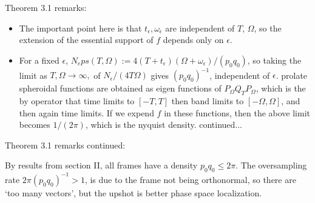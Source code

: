 \documentclass{beamer}
\newcommand{\eps}[0] {  \epsilon }
\begin{document}
\begin{frame}

Theorem 3.1 remarks:

\begin{itemize}
\item The important point here is that $t_\eps, \omega_\eps$ are independent of $T$, $\Omega$, so the extension of the essential support of $f$ depends only on $\eps$.
\item For a fixed $\eps$, $N_eps(T,\Omega) := 4(T + t_\eps)(\Omega + \omega_\eps)/(p_0 q_0)$, so taking the limit as $T,\Omega \rightarrow \infty,$ of $N_\eps/(4 T \Omega)$ gives $(p_0 q_0)^{-1}$, independent of $\eps$. prolate spheroidal functions are obtained as eigen functions of $P_\Omega Q_T P_\Omega$, which is the by operator that time limits to $[-T,T]$ then band limits to $[-\Omega,\Omega]$, and then again time limits. If we expend $f$ in these functions, then the above limit becomes $1/(2 \pi)$, which is the nyquist density. continued...
\end{itemize}



\end{frame}



\begin{frame}

Theorem 3.1 remarks continued:

By results from section II, all frames have a density $p_0 q_0 \le 2 \pi$. The oversampling rate $2 \pi (p_0 q_0)^{-1} > 1$, is due to the frame not being orthonormal, so there are `too many vectors', but the upshot is better phase space localization.



\end{frame}
\end{document}
